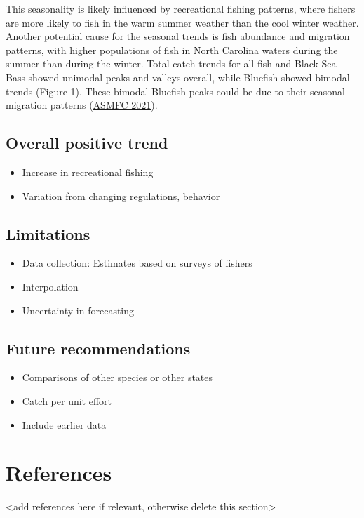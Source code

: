 \documentclass[
  12pt,
]{article}
\providecommand{\tightlist}{%
  \setlength{\itemsep}{0pt}\setlength{\parskip}{0pt}}
\begin{document}
This seasonality is likely influenced by recreational fishing patterns,
where fishers are more likely to fish in the warm summer weather than
the cool winter weather. Another potential cause for the seasonal trends
is fish abundance and migration patterns, with higher populations of
fish in North Carolina waters during the summer than during the winter.
Total catch trends for all fish and Black Sea Bass showed unimodal peaks
and valleys overall, while Bluefish showed bimodal trends (Figure 1).
These bimodal Bluefish peaks could be due to their seasonal migration
patterns (\href{http://www.asmfc.org/species/bluefish}{ASMFC 2021}).

\hypertarget{overall-positive-trend}{%
\subsection{Overall positive trend}\label{overall-positive-trend}}

\begin{itemize}
\tightlist
\item
  Increase in recreational fishing
\item
  Variation from changing regulations, behavior
\end{itemize}

\hypertarget{limitations}{%
\subsection{Limitations}\label{limitations}}

\begin{itemize}
\tightlist
\item
  Data collection: Estimates based on surveys of fishers
\item
  Interpolation
\item
  Uncertainty in forecasting
\end{itemize}

\hypertarget{future-recommendations}{%
\subsection{Future recommendations}\label{future-recommendations}}

\begin{itemize}
\tightlist
\item
  Comparisons of other species or other states
\item
  Catch per unit effort
\item
  Include earlier data
\end{itemize}

\newpage

\hypertarget{references}{%
\section{References}\label{references}}

\textless add references here if relevant, otherwise delete this
section\textgreater{}
\end{document}
